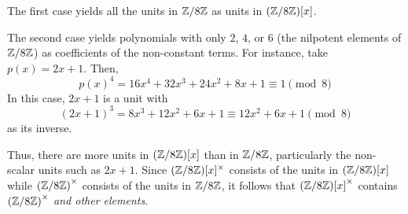 \begin{problem}
\begin{enumalph}
\begin{Answer}
        \begin{enumalph}
          \item The first case yields all the units in $\mathbb{Z}/8\mathbb{Z}$ as units in $(\mathbb{Z}/8\mathbb{Z})[x]$.
          \item The second case yields polynomials with only $2$, $4$, or $6$ (the nilpotent elements
          of $\mathbb{Z}/8\mathbb{Z}$) as coefficients
          of the non-constant terms.
          For instance, take $p(x) = 2x + 1$.
          Then, \[ {p(x)}^4 = 16x^4 + 32x^3 + 24x^2 + 8x + 1 \equiv 1 \pmod 8 \]
          In this case, $2x + 1$ is a unit with
          \[ {(2x + 1)}^3 = 8x^3 + 12x^2 + 6x + 1 \equiv 12x^2 + 6x + 1 \pmod 8 \] as its inverse.
        \end{enumalph}
        Thus, there are more units in $(\mathbb{Z}/8\mathbb{Z})[x]$ than in $\mathbb{Z}/8\mathbb{Z}$, particularly the non-scalar
        units such as $2x + 1$. Since $(\mathbb{Z}/8\mathbb{Z})[x]^\times$ consists of the units in $(\mathbb{Z}/8\mathbb{Z})[x]$
        while ${(\mathbb{Z}/8\mathbb{Z})}^\times$ consists of the units in $\mathbb{Z}/8\mathbb{Z}$, it follows that
        ${(\mathbb{Z}/8\mathbb{Z})[x]}^\times$ contains ${(\mathbb{Z}/8\mathbb{Z})}^\times$ \emph{and other elements}.
      \end{Answer}
  \end{enumalph}
\end{problem}
